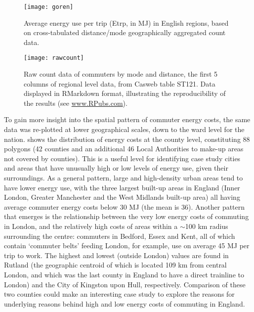 \begin{figure}[htbp]
\begin{center}
    \texttt{[image: goren]}  \end{center}
  \caption[Average energy use per trip (Etrp, in MJ) in English regions]
  {Average energy use per trip (Etrp, in MJ) in English regions, based
  on cross-tabulated distance/mode geographically aggregated count data.}
 \label{fgoren}
\end{figure}

\begin{figure}[htbp]
\begin{center}
    \texttt{[image: rawcount]}  \end{center}
  \caption[Raw count data of commuters by mode and distance.]
  {Raw count data of commuters by mode and distance, the first 5 columns of
  regional level data, from Casweb table ST121. Data displayed in RMarkdown
  format, illustrating the reproducibility of the results (see
  \href{http://rpubs.com/robinlovelace}{www.RPubs.com}).}
 \label{frcount}
\end{figure}

To gain more insight into the spatial pattern of commuter energy costs,
the same data was re-plotted at lower geographical scales, down to the ward
level for the nation.  shows the distribution of energy costs
at the county level, constituting 88 polygons (42 counties and an additional 46
Local Authorities to make-up areas not covered by counties). This is a useful
level for identifying case study cities and areas that have unusually high
or low levels of energy use, given their surroundings. As a general pattern,
large and high-density urban areas tend to have lower energy use, with
the three largest built-up areas in England (Inner London, Greater Manchester
and the West Midlands built-up area) all having average commuter energy costs
below 30 MJ (the mean is 36). Another pattern that emerges is the relationship
between the very low energy costs of commuting in London, and the relatively high
costs of areas within a $\sim$100 km radius surrounding the centre: commuters in Bedford, Essex and
Kent, all of which contain `commuter belts' feeding London, for example, use
on average 45 MJ per trip to work. The highest and lowest (outside London)
values are found in Rutland (the geographic centroid of which is located 109
km from central London, and which was the last county in England to have
a direct trainline to London) and the City of Kingston upon Hull, respectively.
Comparison of these two counties could make an interesting case study
to explore the reasons for underlying reasons behind high and low
energy costs of commuting in England.

